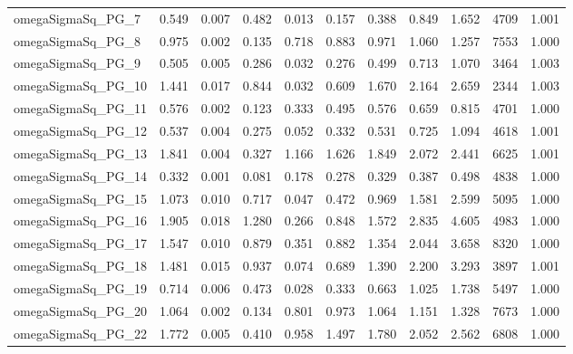 \documentclass[12pt]{article}
\begin{document}
\begin{longtable}{lrrrrrrrrrr}
omegaSigmaSq\_PG\_7  & 0.549 & 0.007 & 0.482 & 0.013 & 0.157 & 0.388 & 0.849 & 1.652 &  4709 & 1.001 \\
omegaSigmaSq\_PG\_8  & 0.975 & 0.002 & 0.135 & 0.718 & 0.883 & 0.971 & 1.060 & 1.257 &  7553 & 1.000 \\
omegaSigmaSq\_PG\_9  & 0.505 & 0.005 & 0.286 & 0.032 & 0.276 & 0.499 & 0.713 & 1.070 &  3464 & 1.003 \\
omegaSigmaSq\_PG\_10 & 1.441 & 0.017 & 0.844 & 0.032 & 0.609 & 1.670 & 2.164 & 2.659 &  2344 & 1.003 \\
omegaSigmaSq\_PG\_11 & 0.576 & 0.002 & 0.123 & 0.333 & 0.495 & 0.576 & 0.659 & 0.815 &  4701 & 1.000 \\
omegaSigmaSq\_PG\_12 & 0.537 & 0.004 & 0.275 & 0.052 & 0.332 & 0.531 & 0.725 & 1.094 &  4618 & 1.001 \\
omegaSigmaSq\_PG\_13 & 1.841 & 0.004 & 0.327 & 1.166 & 1.626 & 1.849 & 2.072 & 2.441 &  6625 & 1.001 \\
omegaSigmaSq\_PG\_14 & 0.332 & 0.001 & 0.081 & 0.178 & 0.278 & 0.329 & 0.387 & 0.498 &  4838 & 1.000 \\
omegaSigmaSq\_PG\_15 & 1.073 & 0.010 & 0.717 & 0.047 & 0.472 & 0.969 & 1.581 & 2.599 &  5095 & 1.000 \\
omegaSigmaSq\_PG\_16 & 1.905 & 0.018 & 1.280 & 0.266 & 0.848 & 1.572 & 2.835 & 4.605 &  4983 & 1.000 \\
omegaSigmaSq\_PG\_17 & 1.547 & 0.010 & 0.879 & 0.351 & 0.882 & 1.354 & 2.044 & 3.658 &  8320 & 1.000 \\
omegaSigmaSq\_PG\_18 & 1.481 & 0.015 & 0.937 & 0.074 & 0.689 & 1.390 & 2.200 & 3.293 &  3897 & 1.001 \\
omegaSigmaSq\_PG\_19 & 0.714 & 0.006 & 0.473 & 0.028 & 0.333 & 0.663 & 1.025 & 1.738 &  5497 & 1.000 \\
omegaSigmaSq\_PG\_20 & 1.064 & 0.002 & 0.134 & 0.801 & 0.973 & 1.064 & 1.151 & 1.328 &  7673 & 1.000 \\
omegaSigmaSq\_PG\_22 & 1.772 & 0.005 & 0.410 & 0.958 & 1.497 & 1.780 & 2.052 & 2.562 &  6808 & 1.000 \\
\end{longtable}
\endgroup


\newpage
\end{document}
